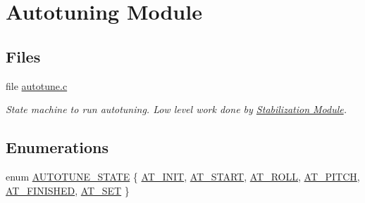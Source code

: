 \hypertarget{group___autotuning_module}{\section{\-Autotuning \-Module}
\label{group___autotuning_module}
}
\subsection*{\-Files}
\begin{DoxyCompactItemize}
\item 
file \hyperlink{autotune_8c}{autotune.\-c}
\begin{DoxyCompactList}\small\item\em \-State machine to run autotuning. \-Low level work done by \hyperlink{group___stabilization_module}{\-Stabilization \-Module}. \end{DoxyCompactList}\end{DoxyCompactItemize}
\subsection*{\-Enumerations}
\begin{DoxyCompactItemize}
\item 
enum \hyperlink{group___autotuning_module_gac104fc2be1ec1bdac638e8bb7fa4ce7a}{\-A\-U\-T\-O\-T\-U\-N\-E\-\_\-\-S\-T\-A\-T\-E} \{ \*
\hyperlink{group___autotuning_module_ggac104fc2be1ec1bdac638e8bb7fa4ce7aa212188919cef420e2de9232d9029a92b}{\-A\-T\-\_\-\-I\-N\-I\-T}, 
\hyperlink{group___autotuning_module_ggac104fc2be1ec1bdac638e8bb7fa4ce7aa593de3fe66dd4fb0c156ebe006f13c0d}{\-A\-T\-\_\-\-S\-T\-A\-R\-T}, 
\hyperlink{group___autotuning_module_ggac104fc2be1ec1bdac638e8bb7fa4ce7aa6efd216e71ef62290cda172d919990ab}{\-A\-T\-\_\-\-R\-O\-L\-L}, 
\hyperlink{group___autotuning_module_ggac104fc2be1ec1bdac638e8bb7fa4ce7aac1602077ee9f4897df7eaad0800cf52b}{\-A\-T\-\_\-\-P\-I\-T\-C\-H}, 
\*
\hyperlink{group___autotuning_module_ggac104fc2be1ec1bdac638e8bb7fa4ce7aa160493d923f91bf421ce49dd525a54ee}{\-A\-T\-\_\-\-F\-I\-N\-I\-S\-H\-E\-D}, 
\hyperlink{group___autotuning_module_ggac104fc2be1ec1bdac638e8bb7fa4ce7aa558d9f3a1ed056f22c855a7058864461}{\-A\-T\-\_\-\-S\-E\-T}
 \}
\end{DoxyCompactItemize}

